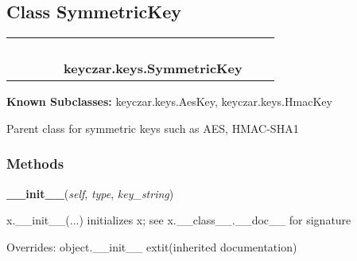 

\subsection{Class SymmetricKey}

    \label{keyczar:keys:SymmetricKey}
\begin{tabular}{cccccccc}
\multicolumn{2}{r}{\settowidth{\BCL}{object}\multirow{2}{\BCL}{object}}
&&
&&
  \\\cline{3-3}
  &&\multicolumn{1}{c|}{}
&&
&&
  \\
\multicolumn{4}{r}{\settowidth{\BCL}{keyczar.keys.Key}\multirow{2}{\BCL}{keyczar.keys.Key}}
&&
  \\\cline{5-5}
  &&&&\multicolumn{1}{c|}{}
&&
  \\
&&&&\multicolumn{2}{l}{\textbf{keyczar.keys.SymmetricKey}}
\end{tabular}

\textbf{Known Subclasses:}
keyczar.keys.AesKey,
    keyczar.keys.HmacKey

Parent class for symmetric keys such as AES, HMAC-SHA1



  \subsubsection{Methods}

    \vspace{0.5ex}

\hspace{.8\funcindent}\begin{boxedminipage}{\funcwidth}

    \raggedright \textbf{\_\_init\_\_}(\textit{self}, \textit{type}, \textit{key\_string})

\setlength{\parskip}{2ex}
    x.\_\_init\_\_(...) initializes x; see x.\_\_class\_\_.\_\_doc\_\_ for 
    signature

\setlength{\parskip}{1ex}
      Overrides: object.\_\_init\_\_ 	extit{(inherited documentation)}

    \end{boxedminipage}


